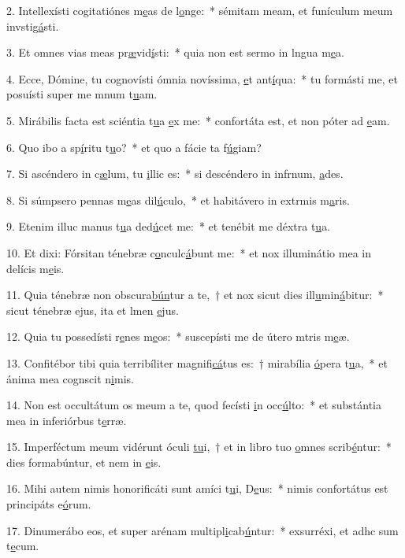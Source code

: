 2. Intellexísti cogitatiónes m\uline{e}as de l\uline{o}nge:~* sémitam meam, et funículum meum invstig\uline{á}sti.\par 
3. Et omnes vias meas pr\uline{æ}vid\uline{í}sti:~* quia non est sermo in lngua m\uline{e}a.\par 
4. Ecce, Dómine, tu cognovísti ómnia novíssima, \uline{e}t ant\uline{í}qua:~* tu formásti me, et posuísti super me mnum t\uline{u}am.\par 
5. Mirábilis facta est sciéntia t\uline{u}a \uline{e}x me:~* confortáta est, et non póter ad \uline{e}am.\par 
6. Quo ibo a sp\uline{í}ritu t\uline{u}o?~* et quo a fácie ta f\uline{ú}giam?\par 
7. Si ascéndero in c\uline{æ}lum, tu \uline{i}llic es:~* si descéndero in infrnum, \uline{a}des.\par 
8. Si súmpsero pennas m\uline{e}as dil\uline{ú}culo,~* et habitávero in extrmis m\uline{a}ris.\par 
9. Etenim illuc manus t\uline{u}a ded\uline{ú}cet me:~* et tenébit me déxtra t\uline{u}a.\par 
10. Et dixi: Fórsitan ténebræ c\uline{o}nculc\uline{á}bunt me:~* et nox illuminátio mea in delícis m\uline{e}is.\par 
11. Quia ténebræ non obscura\uline{bún}tur a te,~† et nox sicut dies ill\uline{u}min\uline{á}bitur:~* sicut ténebræ ejus, ita et lmen \uline{e}jus.\par 
12. Quia tu possedísti r\uline{e}nes m\uline{e}os:~* suscepísti me de útero mtris m\uline{e}æ.\par 
13. Confitébor tibi quia terribíliter magnifi\uline{cá}tus es:~† mirabília \uline{ó}pera t\uline{u}a,~* et ánima mea cognscit n\uline{i}mis.\par 
14. Non est occultátum os meum a te, quod fecísti \uline{i}n occ\uline{ú}lto:~* et substántia mea in inferiórbus t\uline{e}rræ.\par 
15. Imperféctum meum vidérunt óculi \uline{tu}i,~† et in libro tuo \uline{o}mnes scrib\uline{é}ntur:~* dies formabúntur, et nem in \uline{e}is.\par 
16. Mihi autem nimis honorificáti sunt amíci t\uline{u}i, D\uline{e}us:~* nimis confortátus est principáts e\uline{ó}rum.\par 
17. Dinumerábo eos, et super arénam multipl\uline{i}cab\uline{ú}ntur:~* exsurréxi, et adhc sum t\uline{e}cum.\par 
